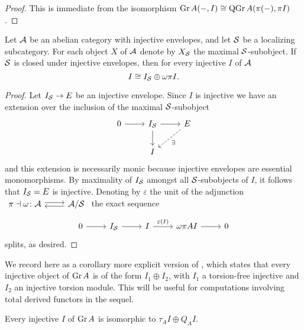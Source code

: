 \begin{proof}
  This is immediate from the isomorphism \(\operatorname{Gr}A(-, I) \cong \operatorname{QGr}A(\pi(-), \pi{I})\).
\end{proof}

\begin{proposition}\label{prop: decomposition of injectives}
  Let \(\mathcal{A}\) be an abelian category with injective envelopes, and let \(\mathcal{S}\) be a localizing subcategory.
  For each object \(X\) of \(\mathcal{A}\) denote by \(X_{\mathcal{S}}\) the maximal \(\mathcal{S}\)-subobject.
  If \(\mathcal{S}\) is closed under injective envelopes, then for every injective \(I\) of \(\mathcal{A}\)
  \[I \cong I_{\mathcal{S}} \oplus \omega\pi{I}.\]
\end{proposition}

\begin{proof}
  Let \(I_{\mathcal{S}} \to E\) be an injective envelope.
  Since \(I\) is injective we have an extension over the inclusion of the maximal \(\mathcal{S}\)-subobject
  \[\begin{tikzcd}
  0 \arrow{r} & I_\Serre \arrow{r}\arrow{d} & E \arrow[dashed]{ld}{\exists}\\
  & I
  \end{tikzcd}\]
  and this extension is necessarily monic because injective envelopes are essential monomorphisms.
  By maximality of \(I_{\mathcal{S}}\) amongst all \(\mathcal{S}\)-subobjects of \(I\), it follows that \(I_{\mathcal{S}} = E\) is injective.
  Denoting by \(\varepsilon\) the unit of the adjunction
  \(\begin{tikzcd}
  \pi \dashv \omega \colon \A \arrow[shift left=.5ex]{r} & \A/\Serre \arrow[shift left=.5ex]{l}
  \end{tikzcd}\)
  the exact sequence
  \[\begin{tikzcd}
  0 \arrow{r} & I_\Serre \arrow{r} & I \arrow{r}{\varepsilon(I)} & \omega\pi{A} I \arrow{r} & 0
  \end{tikzcd}\]  splits, as desired.
\end{proof}
We record here as a corollary more explicit version of \cite[Prop 7.1 (5)]{AZ94}, which states that every injective object of \(\operatorname{Gr}A\) is of the form \(I_1 \oplus I_2\), with \(I_1\) a torsion-free injective and \(I_2\) an injective torsion module.
This will be useful for computations involving total derived functors in the sequel.

\begin{corollary} \label{cor: Gr injectives}
  Every injective \(I\) of \(\operatorname{Gr}A\) is isomorphic to \(\tau_A I \oplus Q_A I\).

\end{corollary}

